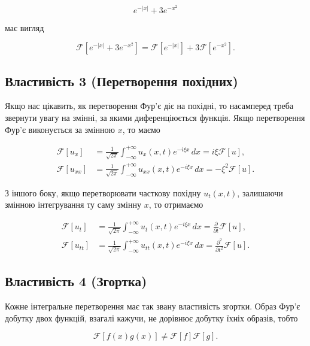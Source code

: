 \documentclass[
  ukrainian,
]{article}
\begin{document}
\[
e^{-|x|} + 3e^{-x^2}
\]

має вигляд

\[
\mathcal{F}\left[e^{-|x|} + 3e^{-x^2}\right]
= \mathcal{F}\left[e^{-|x|}\right] + 3\mathcal{F}\left[e^{-x^2}\right].
\]

\subsection{Властивість 3 (Перетворення
похідних)}\label{ux432ux43bux430ux441ux442ux438ux432ux456ux441ux442ux44c-3-ux43fux435ux440ux435ux442ux432ux43eux440ux435ux43dux43dux44f-ux43fux43eux445ux456ux434ux43dux438ux445}

Якщо нас цікавить, як перетворення Фур'є діє на похідні, то насамперед
треба звернути увагу на змінні, за якими диференціюється функція. Якщо
перетворення Фур'є виконується за змінною \(x\), то маємо

\[
\begin{aligned}
\mathcal{F}[u_x] &= \frac{1}{\sqrt{2\pi}} \int_{-\infty}^{+\infty} u_x(x,t)e^{-i\xi x}\,dx = i\xi \mathcal{F}[u], \\
\mathcal{F}[u_{xx}] &= \frac{1}{\sqrt{2\pi}} \int_{-\infty}^{+\infty} u_{xx}(x,t)e^{-i\xi x}\,dx = -\xi^2 \mathcal{F}[u].
\end{aligned}
\]

З іншого боку, якщо перетворювати часткову похідну \(u_t(x,t)\),
залишаючи змінною інтегрування ту саму змінну \(x\), то отримаємо

\[
\begin{aligned}
\mathcal{F}[u_t] &= \frac{1}{\sqrt{2\pi}} \int_{-\infty}^{+\infty} u_t(x,t)e^{-i\xi x}\,dx = \frac{\partial}{\partial t}\mathcal{F}[u], \\
\mathcal{F}[u_{tt}] &= \frac{1}{\sqrt{2\pi}} \int_{-\infty}^{+\infty} u_{tt}(x,t)e^{-i\xi x}\,dx = \frac{\partial^2}{\partial t^2}\mathcal{F}[u].
\end{aligned}
\]

\subsection{Властивість 4
(Згортка)}\label{ux432ux43bux430ux441ux442ux438ux432ux456ux441ux442ux44c-4-ux437ux433ux43eux440ux442ux43aux430}

Кожне інтегральне перетворення має так звану властивість згортки. Образ
Фур'є добутку двох функцій, взагалі кажучи, не дорівнює добутку їхніх
образів, тобто

\[
\mathcal{F}[f(x)g(x)] \neq \mathcal{F}[f]\mathcal{F}[g].
\]
\end{document}
